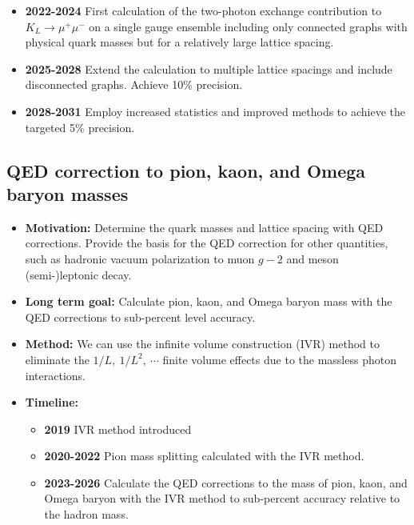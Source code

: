 \documentclass[12pt,hyperpdf]{article}
\begin{document}
\begin{itemize}
\begin{itemize}
    \item{\bf 2022-2024} First calculation of the two-photon exchange contribution 
    to $K_L\to\mu^+ \mu^-$ on a single gauge ensemble including only connected 
    graphs with physical quark masses but for a relatively large lattice spacing.
    \item{\bf 2025-2028} Extend the calculation to multiple lattice spacings and include 
    disconnected graphs.  Achieve 10\% precision.
    \item{\bf 2028-2031} Employ increased statistics and improved methods to 
    achieve the targeted 5\% precision.
\end{itemize}
\end{itemize}

\subsection{QED correction to pion, kaon, and Omega baryon masses}
\begin{itemize}
    \item{\bf Motivation:} Determine the quark masses and lattice spacing with QED corrections. Provide the basis for the QED correction for other quantities, such as hadronic vacuum polarization to muon $g-2$ and meson (semi-)leptonic decay.
    \item{\bf Long term goal:} Calculate pion, kaon, and Omega baryon mass with the QED corrections to sub-percent level accuracy.
    \item{\bf Method:}
      We can use the infinite volume construction (IVR) method \cite{Feng:2018qpx} to eliminate
      the $1/L,~1/L^2,~\cdots$ finite volume effects due to the massless photon interactions.
\item{\bf Timeline:}
\begin{itemize}
    \item{\bf 2019} IVR method introduced
    \item{\bf 2020-2022} Pion mass splitting calculated with the IVR method.
    \item{\bf 2023-2026} Calculate the QED corrections to the mass of pion, kaon, and Omega baryon with the IVR method to sub-percent accuracy relative to the hadron mass.
\end{itemize}
\end{itemize}
\end{document}
